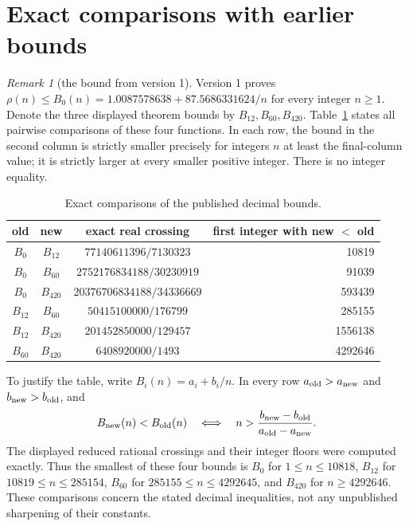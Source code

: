 \documentclass[10pt]{article}
\theoremstyle{remark}
\newtheorem{remark}[theorem]{Remark}
\begin{document}
\section{Exact comparisons with earlier bounds}\label{sec:comparison}
\begin{remark}[the bound from version 1]
Version 1 proves $\rho(n)\le B_0(n)=1.0087578638+87.5686331624/n$
for every integer $n\ge1$. Denote the three displayed theorem
bounds by $B_{12},B_{60},B_{420}$. Table~\ref{tab:crossings} states all
pairwise comparisons of these four functions. In each row, the bound
in the second column is strictly smaller precisely for integers $n$
at least the final-column value; it is strictly larger at every smaller
positive integer. There is no integer equality.
\end{remark}
\begin{table}[ht]
\centering
\begin{tabular}{c|c|c|r}
old & new & exact real crossing & first integer with new $<$ old\\\hline
$B_0$ & $B_{12}$ & $77140611396/7130323$ & 10819\\
$B_0$ & $B_{60}$ & $2752176834188/30230919$ & 91039\\
$B_0$ & $B_{420}$ & $20376706834188/34336669$ & 593439\\
$B_{12}$ & $B_{60}$ & $50415100000/176799$ & 285155\\
$B_{12}$ & $B_{420}$ & $201452850000/129457$ & 1556138\\
$B_{60}$ & $B_{420}$ & $6408920000/1493$ & 4292646
\end{tabular}
\caption{Exact comparisons of the published decimal bounds.}\label{tab:crossings}
\end{table}
To justify the table, write $B_i(n)=a_i+b_i/n$. In every row
$a_{\rm old}>a_{\rm new}$ and $b_{\rm new}>b_{\rm old}$, and
\[
 B_{\rm new}(n)<B_{\rm old}(n)
 \quad\Longleftrightarrow\quad
 n>\frac{b_{\rm new}-b_{\rm old}}{a_{\rm old}-a_{\rm new}}.
\]
The displayed reduced rational crossings and their integer floors
were computed exactly. Thus the smallest of these four bounds is
$B_0$ for $1\le n\le10818$, $B_{12}$ for $10819\le n\le285154$,
$B_{60}$ for $285155\le n\le4292645$, and $B_{420}$ for
$n\ge4292646$. These comparisons concern the stated decimal
inequalities, not any unpublished sharpening of their constants.
\end{document}
